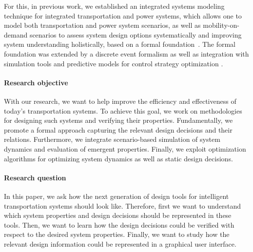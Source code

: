 \documentclass[a4paper,twoside]{article}
\begin{document}
	
	For this, in previous work, we established an integrated systems modeling technique for integrated transportation and power systems, which allows one to model both transportation and power system scenarios, as well as mobility-on-demand scenarios to assess system design options systematically and improving system understanding holistically, based on a formal foundation~\cite{ascher_hackenberg_2014,ascher_hackenberg_2015,ascher_hackenberg_2016,ascher_hackenberg_2017}. The formal foundation was extended by a discrete event formalism \cite{ascher2023discrete} as well as integration with simulation tools and predictive models for control strategy optimization \cite{ascher_hackenberg_albayrak_2023}.
	
	\paragraph{Research objective}
	
	With our research, we want to help improve the efficiency and effectiveness of today's transportation systems.
	To achieve this goal, we work on methodologies for designing such systems and verifying their properties.
	Fundamentally, we promote a formal approach capturing the relevant design decisions and their relations.
	Furthermore, we integrate scenario-based simulation of system dynamics and evaluation of emergent properties.
	Finally, we exploit optimization algorithms for optimizing system dynamics as well as static design decisions.
	
	\paragraph{Research question}
	
	In this paper, we ask how the next generation of design tools for intelligent transportation systems should look like.
	Therefore, first we want to understand which system properties and design decisions should be represented in these tools.
	Then, we want to learn how the design decisions could be verified with respect to the desired system properties.
	Finally, we want to study how the relevant design information could be represented in a graphical user interface.
	
\end{document}
